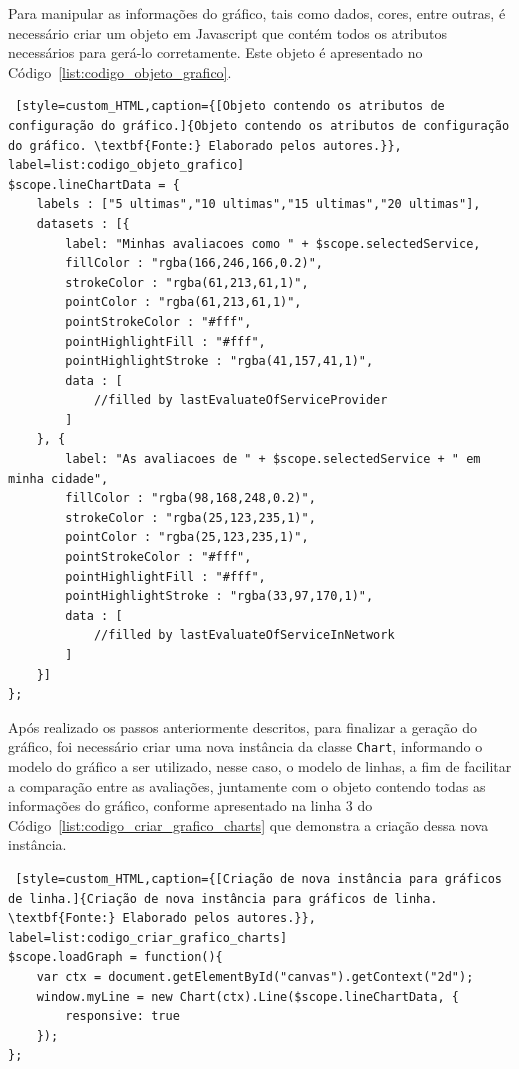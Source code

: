 \par Para manipular as informações do gráfico, tais como dados, cores, entre outras, é necessário criar um objeto em Javascript que contém todos os atributos necessários para gerá-lo corretamente. Este objeto é apresentado no Código~\ref{list:codigo_objeto_grafico}.

\begin{lstlisting} [style=custom_HTML,caption={[Objeto contendo os atributos de configuração do gráfico.]{Objeto contendo os atributos de configuração do gráfico. \textbf{Fonte:} Elaborado pelos autores.}}, label=list:codigo_objeto_grafico] 	
$scope.lineChartData = {
	labels : ["5 ultimas","10 ultimas","15 ultimas","20 ultimas"],
	datasets : [{
		label: "Minhas avaliacoes como " + $scope.selectedService,
		fillColor : "rgba(166,246,166,0.2)",
		strokeColor : "rgba(61,213,61,1)",
		pointColor : "rgba(61,213,61,1)",
		pointStrokeColor : "#fff",
		pointHighlightFill : "#fff",
		pointHighlightStroke : "rgba(41,157,41,1)",
		data : [
			//filled by lastEvaluateOfServiceProvider
		]   
	}, {
		label: "As avaliacoes de " + $scope.selectedService + " em minha cidade",
		fillColor : "rgba(98,168,248,0.2)",
		strokeColor : "rgba(25,123,235,1)",
		pointColor : "rgba(25,123,235,1)",
		pointStrokeColor : "#fff",
		pointHighlightFill : "#fff",
		pointHighlightStroke : "rgba(33,97,170,1)",
		data : [
			//filled by lastEvaluateOfServiceInNetwork
		]
	}]
};
\end{lstlisting}

\par Após realizado os passos anteriormente descritos, para finalizar a geração do gráfico, foi necessário criar uma nova instância da classe \texttt{Chart}, informando o modelo do gráfico a ser utilizado, nesse caso, o modelo de linhas, a fim de facilitar a comparação entre as avaliações, juntamente com o objeto contendo todas as informações do gráfico, conforme apresentado na linha 3 do Código~\ref{list:codigo_criar_grafico_charts} que demonstra a criação dessa nova instância.

\begin{lstlisting} [style=custom_HTML,caption={[Criação de nova instância para gráficos de linha.]{Criação de nova instância para gráficos de linha. \textbf{Fonte:} Elaborado pelos autores.}}, label=list:codigo_criar_grafico_charts] 	
$scope.loadGraph = function(){
	var ctx = document.getElementById("canvas").getContext("2d");
	window.myLine = new Chart(ctx).Line($scope.lineChartData, {
		responsive: true
	});
};
\end{lstlisting}

